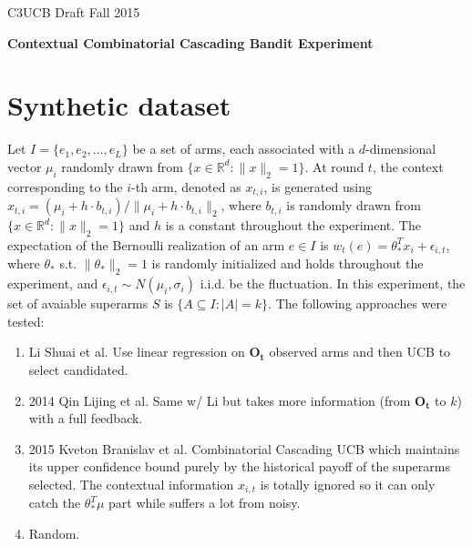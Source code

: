 \documentclass[a4paper,11pt]{article}
\begin{document}
C3UCB Draft \hfill Fall 2015

\vspace*{\baselineskip}

\begin{center}
  \textbf{Contextual Combinatorial Cascading Bandit Experiment}
\end{center}

\vspace*{2\baselineskip}

\section{Synthetic dataset}

Let $I=\{e_1,e_2,\dots,e_L\}$ be a set of arms, each associated with a $d$-dimensional vector $\mu_i$ randomly drawn from $\{x\in \mathbb{R}^d : \|x\|_2=1\}$. At round $t$, the context corresponding to the $i$-th arm, denoted as $x_{t,i}$, is generated using $x_{t,i}=(\mu_i+h\cdot b_{t,i})/\|\mu_i+h\cdot b_{t,i}\|_2$, where $b_{t,i}$ is randomly drawn from $\{x\in \mathbb{R}^d : \|x\|_2=1\}$ and $h$ is a constant throughout the experiment. The expectation of the Bernoulli realization of an arm $e\in I$ is $w_t(e)=\theta_\ast^Tx_i + \epsilon_{i,t}$, where $\theta_\ast$ s.t. $\|\theta_\ast\|_2=1$ is randomly initialized and holds throughout the experiment, and $\epsilon_{i,t}\sim N(\mu_i,\sigma_i)$ i.i.d. be the fluctuation. In this experiment, the set of avaiable superarms $S$ is $\{A\subseteq I:|A|=k\}$. The following approaches were tested:

\begin{enumerate}

  \item Li Shuai et al. Use linear regression on $\mathbf{O_t}$ observed arms and then UCB to select candidated.

  \item 2014 Qin Lijing et al. Same w/ Li but takes more information (from $\mathbf{O_t}$ to $k$) with a full feedback. 

  \item 2015 Kveton Branislav et al. Combinatorial Cascading UCB which maintains its upper confidence bound purely by the historical payoff of the superarms selected. The contextual information $x_{i,t}$ is totally ignored so it can only catch the $\theta_\ast^T\mu$ part while suffers a lot from noisy.

  \item Random.

\end{enumerate}
\end{document}
